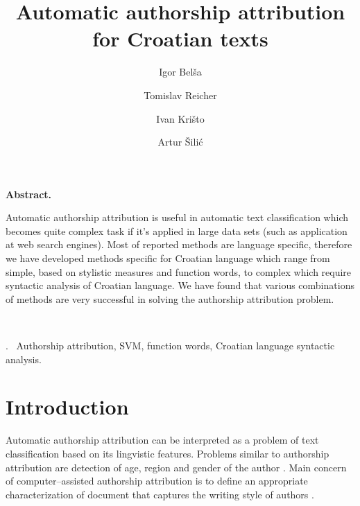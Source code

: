 \documentclass[11pt,english]{article}
\let\LaTeXtitle\title
\renewcommand{\title}[1]{\LaTeXtitle{\Large \textbf{#1}}}
\renewenvironment{abstract}
{\noindent \large \bf Abstract. \normalsize \begin{it}}
{\end{it}\\}
\newenvironment{keywords}
{\noindent {\large {\bf Keywords}}.~}{}
\begin{document}
\title{Automatic authorship attribution for Croatian texts}
\author{Igor Belša}
\author{Tomislav Reicher}
\author{Ivan Krišto}
\author{Artur Šilić}

\date{}

\maketitle

\thispagestyle{empty}
\pagestyle{empty}
\begin{multicols}{2}


\begin{abstract}
Automatic authorship attribution is useful in automatic text classification
which becomes quite complex task if it's applied in large data sets (such as
application at web search engines). Most of reported methods are language
specific, therefore we have developed methods specific for Croatian language
which range from simple, based on stylistic measures and function words, to
complex which require syntactic analysis of Croatian language. We have found that
various combinations of methods are very successful in solving the authorship
attribution problem.
\end{abstract}

\begin{keywords}
Authorship attribution, SVM, function words, Croatian language syntactic
analysis.
\end{keywords}

\section{Introduction}
Automatic authorship attribution can be interpreted as a problem of text
classification based on its lingvistic features. Problems similar to authorship
attribution are detection of age, region and gender of the author
\citep{luyckx2005shallow}. Main concern of computer--assisted authorship
attribution is to define an appropriate characterization of document that
captures the writing style of authors \citep{coyotl2006authorship}.



\end{multicols}
\end{document}
